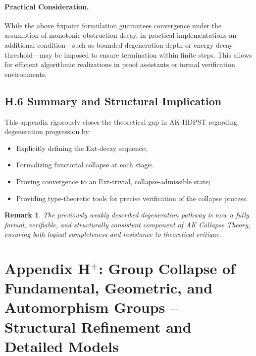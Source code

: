 \documentclass[11pt]{article}
\newtheorem{remark}[theorem]{Remark}
\begin{document}
\paragraph{Practical Consideration.}
While the above fixpoint formulation guarantees convergence under the assumption of monotonic obstruction decay, in practical implementations an additional condition—such as bounded degeneration depth or energy decay threshold—may be imposed to ensure termination within finite steps. This allows for efficient algorithmic realizations in proof assistants or formal verification environments.


\subsection*{H.6 Summary and Structural Implication}

This appendix rigorously closes the theoretical gap in AK-HDPST regarding degeneration progression by:

\begin{itemize}
    \item Explicitly defining the Ext-decay sequence;
    \item Formalizing functorial collapse at each stage;
    \item Proving convergence to an Ext-trivial, collapse-admissible state;
    \item Providing type-theoretic tools for precise verification of the collapse process.
\end{itemize}

\begin{remark}
The previously weakly described degeneration pathway is now a fully formal, verifiable, and structurally consistent component of AK Collapse Theory, ensuring both logical completeness and resistance to theoretical critique.
\end{remark}




\section*{Appendix H$^{+}$: Group Collapse of Fundamental, Geometric, and Automorphism Groups – Structural Refinement and Detailed Models}
\end{document}
